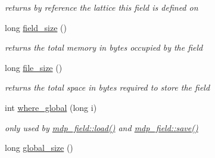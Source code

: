 \begin{CompactItemize}
\begin{CompactList}\small\item\em returns by reference the lattice this field is defined on \item\end{CompactList}\item 
\hypertarget{classmdp__field_561106db7c6e94b3b63b3aee6a91bc79}{
long \hyperlink{classmdp__field_561106db7c6e94b3b63b3aee6a91bc79}{field\_\-size} ()}
\label{classmdp__field_561106db7c6e94b3b63b3aee6a91bc79}

\begin{CompactList}\small\item\em returns the total memory in bytes occupied by the field \item\end{CompactList}\item 
\hypertarget{classmdp__field_9f557dfb7bb760e07d4c92b888d8a40e}{
long \hyperlink{classmdp__field_9f557dfb7bb760e07d4c92b888d8a40e}{file\_\-size} ()}
\label{classmdp__field_9f557dfb7bb760e07d4c92b888d8a40e}

\begin{CompactList}\small\item\em returns the total space in bytes required to store the field \item\end{CompactList}\item 
\hypertarget{classmdp__field_433611d33cb6b05627ffbba6a03e3e6f}{
int \hyperlink{classmdp__field_433611d33cb6b05627ffbba6a03e3e6f}{where\_\-global} (long i)}
\label{classmdp__field_433611d33cb6b05627ffbba6a03e3e6f}

\begin{CompactList}\small\item\em only used by \hyperlink{classmdp__field_9f7c113ef1dea753f54d88ff2b854c40}{mdp\_\-field::load()} and \hyperlink{classmdp__field_e0ada48bbeca95e43b5986e3016c25ef}{mdp\_\-field::save()} \item\end{CompactList}\item 
\hypertarget{classmdp__field_be90c49dd292e4f462a55916dacbc88c}{
long \hyperlink{classmdp__field_be90c49dd292e4f462a55916dacbc88c}{global\_\-size} ()}
\label{classmdp__field_be90c49dd292e4f462a55916dacbc88c}


\end{CompactItemize}
